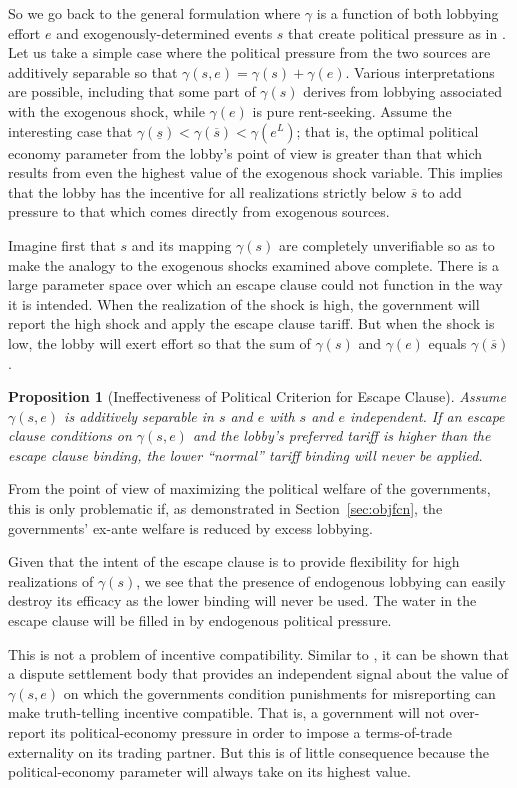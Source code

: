 \documentclass[12pt,titlepage]{article}
\newtheorem{proposition}{Proposition}
\newcommand{\ov}{\overline}
\newcommand{\un}{\underline}
\newcommand{\ga}{\gamma}
\begin{document}
So we go back to the general formulation where $\ga$ is a function of both lobbying effort $e$ and exogenously-determined events $s$ that create political pressure as in \Textcite{ms2011}. Let us take a simple case where the political pressure from the two sources are additively separable so that $\ga(s,e) = \ga(s) + \ga(e)$. Various interpretations are possible, including that some part of $\ga(s)$ derives from lobbying associated with the exogenous shock, while $\ga(e)$ is pure rent-seeking. Assume the interesting case that $\ga(\un{s}) < \ga(\ov{s}) < \ga(e^L)$; that is, the optimal political economy parameter from the lobby's point of view is greater than that which results from even the highest value of the exogenous shock variable. This implies that the lobby has the incentive for all realizations strictly below $\ov{s}$ to add pressure to that which comes directly from exogenous sources.

Imagine first that $s$ and its mapping $\ga(s)$ are completely unverifiable so as to make the analogy to the exogenous shocks examined above complete. There is a large parameter space over which an escape clause could not function in the way it is intended. When the realization of the shock is high, the government will report the high shock and apply the escape clause tariff. But when the shock is low, the lobby will exert effort so that the sum of $\ga(s)$ and $\ga(e)$ equals $\ga(\ov{s})$.

\begin{proposition}[Ineffectiveness of Political Criterion for Escape Clause]
    Assume $\ga(s,e)$ is additively separable in $s$ and $e$ with $s$ and $e$ independent. If an escape clause conditions on $\ga(s,e)$ and the lobby's preferred tariff is higher than the escape clause binding, the lower ``normal'' tariff binding will never be applied.
\end{proposition}

From the point of view of maximizing the political welfare of the governments, this is only problematic if, as demonstrated in Section~\ref{sec:objfcn}, the governments' ex-ante welfare is reduced by excess lobbying.

Given that the intent of the escape clause is to provide flexibility for high realizations of $\ga(s)$, we see that the presence of endogenous lobbying can easily destroy its efficacy as the lower binding will never be used. The water in the escape clause will be filled in by endogenous political pressure.

This is not a problem of incentive compatibility. Similar to \Textcite{beshkar2010b}, it can be shown that a dispute settlement body that provides an independent signal about the value of $\ga(s,e)$ on which the governments condition punishments for misreporting can make truth-telling incentive compatible. That is, a government will not over-report its political-economy pressure in order to impose a terms-of-trade externality on its trading partner. But this is of little consequence because the political-economy parameter will always take on its highest value.
\end{document}

